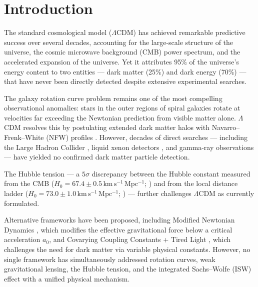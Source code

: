 \documentclass[manuscript,linenumbers]{aastex631}
\newcommand{\kmsMpc}{\,\mathrm{km\,s^{-1}\,Mpc^{-1}}}
\newcommand{\HObs}{H_{\mathrm{0}}}
\begin{document}

\section{Introduction}
\label{sec:intro}

The standard cosmological model ($\Lambda$CDM) has achieved remarkable
predictive success over several decades, accounting for the large-scale
structure of the universe, the cosmic microwave background (CMB) power
spectrum, and the accelerated expansion of the universe.  Yet it
attributes 95\% of the universe's energy content to two entities ---
dark matter (25\%) and dark energy (70\%) --- that have never been
directly detected despite extensive experimental searches.

The galaxy rotation curve problem \citep{Rubin1970, Persic1996} remains
one of the most compelling observational anomalies: stars in the outer
regions of spiral galaxies rotate at velocities far exceeding the
Newtonian prediction from visible matter alone.  $\Lambda$CDM resolves
this by postulating extended dark matter halos with
Navarro--Frenk--White (NFW) profiles \citep{NFW1997}.  However,
decades of direct searches --- including the Large Hadron Collider
\citep{ATLAS2021}, liquid xenon detectors \citep{LZ2024}, and
gamma-ray observations \citep{FermiLAT2015} --- have yielded no
confirmed dark matter particle detection.

The Hubble tension --- a $5\sigma$ discrepancy between the Hubble
constant measured from the CMB
($\HObs = 67.4 \pm 0.5\kmsMpc$; \citealt{Planck2020}) and from the
local distance ladder
($\HObs = 73.0 \pm 1.0\kmsMpc$; \citealt{Riess2022}) --- further
challenges $\Lambda$CDM as currently formulated.

Alternative frameworks have been proposed, including Modified Newtonian
Dynamics \citep[MOND;][]{Milgrom1983}, which modifies the effective
gravitational force below a critical acceleration $a_{0}$, and
Covarying Coupling Constants + Tired Light \citep[CCC+TL;][]{Gupta2024},
which challenges the need for dark matter via variable physical
constants.  However, no single framework has simultaneously addressed
rotation curves, weak gravitational lensing, the Hubble tension, and
the integrated Sachs--Wolfe (ISW) effect with a unified physical
mechanism.
\end{document}
